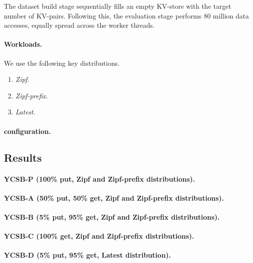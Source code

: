 The dataset build stage sequentially fills an empty KV-store with the target number of KV-pairs. Following this, 
the evaluation stage performs 80 million data accesses, equally spread across the worker threads.   

\paragraph{Workloads.} 

We use the following key distributions. 

\begin{enumerate}
\item {\em Zipf}. 
\item {\em Zipf-prefix}. 
\item {\em Latest}. 
\end{enumerate}

\paragraph{\sys\/ configuration.} 

\subsection{Results}

\paragraph{YCSB-P (100\% put, Zipf and Zipf-prefix distributions).} 

\paragraph{YCSB-A (50\% put, 50\% get, Zipf and Zipf-prefix distributions).} 

\paragraph{YCSB-B (5\% put, 95\% get, Zipf and Zipf-prefix distributions).}

\paragraph{YCSB-C (100\% get, Zipf and Zipf-prefix distributions).}  

\paragraph{YCSB-D (5\% put, 95\% get, Latest distribution).}

